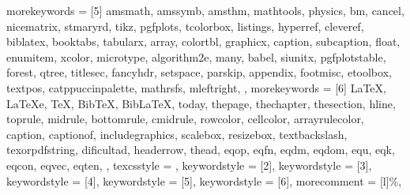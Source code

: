 {  morekeywords = {[5]
    amsmath, amssymb, amsthm, mathtools,
    physics, bm, cancel, nicematrix, stmaryrd,
    tikz, pgfplots, tcolorbox, listings,
    hyperref, cleveref, biblatex,
    booktabs, tabularx, array, colortbl,
    graphicx, caption, subcaption, float,
    enumitem, xcolor, microtype,
    algorithm2e, many, babel,
    siunitx, pgfplotstable, forest, qtree,
    titlesec, fancyhdr, setspace, parskip,
    appendix, footmisc, etoolbox, textpos,
    catppuccinpalette, mathrsfs, mleftright,
  },
  morekeywords = {[6]
    LaTeX, LaTeXe, TeX, BibTeX, BibLaTeX,
    today, thepage, thechapter, thesection,
    hline, toprule, midrule, bottomrule, cmidrule,
    rowcolor, cellcolor, arrayrulecolor,
    caption, captionof, includegraphics,
    scalebox, resizebox, textbackslash,
    texorpdfstring,
    dificultad, headerrow, thead,
    eqop, eqfn, eqdm, eqdom, equ, eqk, eqcon, eqvec, eqten,
  },
  texcsstyle   = {\color{code-keyword}\bfseries},  %
  keywordstyle = {[2]\color{code-fn}},              %
  keywordstyle = {[3]\color{code-operator}},        %
  keywordstyle = {[4]\color{code-macro}},           %
  keywordstyle = {[5]\color{code-mod}},             %
  keywordstyle = {[6]\color{code-builtin}},         %
  morecomment  = [l]{\%},
}

